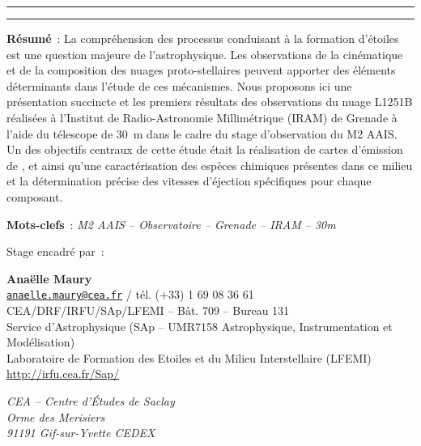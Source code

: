 \documentclass[a4paper,10pt,french]{article}
\begin{document}
\begin{center}

    \vspace{1.5cm}

    \rule[11pt]{5cm}{0.5pt}

    \textbf{\huge \thetitle}

    \rule{5cm}{0.5pt}

    \vspace{1.5cm}

    \parbox{15cm}{\textbf{Résumé} :
        La compréhension des processus conduisant à la formation d’étoiles est
        une question majeure de l’astrophysique. Les observations de la
        cinématique et de la composition des nuages proto-stellaires peuvent
        apporter des éléments déterminants dans l’étude de ces mécanismes. Nous
        proposons ici une présentation succincte et les premiers résultats des
        observations du nuage L1251B réalisées à l’Institut de Radio-Astronomie
        Millimétrique (IRAM) de Grenade à l’aide du télescope de
        \SI{30}{\meter} dans le cadre du stage d’observation du M2 AAIS. Un des
        objectifs centraux de cette étude était la réalisation de cartes
        d’émission de ,  et  ainsi qu’une
        caractérisation des espèces chimiques présentes dans ce milieu et la
        détermination précise des vitesses d’éjection spécifiques pour chaque
        composant.
    }

    \vspace{0.5cm}

    \parbox{15cm}{
        \textbf{Mots-clefs} : \it M2 AAIS – Observatoire – Grenade – IRAM – 30m
    }

    \vspace{0.5cm}

    \parbox{15cm}{
        Stage encadré par :

        \textbf{Anaëlle Maury} \\
        \href{mailto:anaelle.maury@cea.fr}{\tt anaelle.maury@cea.fr} / tél. (+33) 1 69 08 36 61 \\
        CEA/DRF/IRFU/SAp/LFEMI – Bât. 709 – Bureau 131 \\
        Service d’Astrophysique (SAp – UMR7158 Astrophysique, Instrumentation et Modélisation) \\
        Laboratoire de Formation des Etoiles et du Milieu Interstellaire (LFEMI) \\
        \url{http://irfu.cea.fr/Sap/}

        \textit{%
            CEA – Centre d’Études de Saclay \\
            Orme des Merisiers \\
            91191 Gif-sur-Yvette CEDEX
        }
    }


\end{center}
\end{document}
